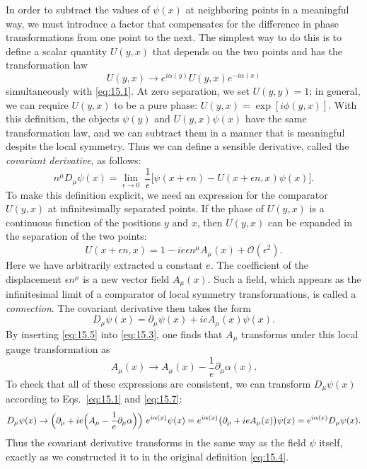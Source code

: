In order to subtract the values of $\psi(x)$ at neighboring points in a
meaningful way, we must introduce a factor that compensates for the
difference in phase transformations from one point to the next.  The simplest
way to do this is to define a scalar quantity $U(y,x)$ that depends on the
two points and has the transformation law
\begin{equation}
  U(y,x) \to e^{i\alpha(y)}U(y,x)e^{-i\alpha(x)}
  \label{eq:15.3}
\end{equation}
simultaneously with \eqref{eq:15.1}.  At zero separation, we set
$U(y,y) = 1$; in general, we can require $U(y,x)$ to be a pure phase:
$U(y,x) = \exp[i\phi(y,x)]$.  With this definition, the objects $\psi(y)$ and
$U(y,x)\psi(x)$ have the same transformation law, and we can subtract them in
a manner that is meaningful despite the local symmetry.  Thus we can define a
sensible derivative, called the \emph{covariant derivative}, as follows:
\begin{equation}
  n^\mu D_\mu\psi(x) = \lim_{\epsilon\to 0}\ \frac{1}{\epsilon}\bigl[
    \psi(x+\epsilon n) - U(x+\epsilon n, x)\psi(x) \bigr] .
  \label{eq:15.4}
\end{equation}
To make this definition explicit, we need an expression for the comparator
$U(y,x)$ at infinitesimally separated points.  If the phase of $U(y,x)$ is a
continuous function of the positions $y$ and $x$, then $U(y,x)$ can be
expanded in the separation of the two points:
\begin{equation}
  U(x+\epsilon n, x) = 1 - ie\epsilon n^\mu A_\mu(x) + \mathcal{O}(\epsilon^2) .
  \label{eq:15.5}
\end{equation}
Here we have arbitrarily extracted a constant $e$.  The coefficient of the
displacement $\epsilon n^\mu$ is a new vector field $A_\mu(x)$.  Such a field,
which appears as the infinitesimal limit of a comparator of local symmetry
transformations, is called a \emph{connection}.  The covariant derivative then
takes the form
\begin{equation}
  D_\mu\psi(x) = \partial_\mu\psi(x) + ieA_\mu(x)\psi(x) .
  \label{eq:15.6}
\end{equation}
By inserting \eqref{eq:15.5} into \eqref{eq:15.3}, one finds that $A_\mu$
transforms under this local gauge transformation as
\begin{equation}
  A_\mu(x) \to A_\mu(x) - \frac{1}{e}\partial_\mu\alpha(x) .
  \label{eq:15.7}
\end{equation}
To check that all of these expressions are consistent, we can transform
$D_\mu\psi(x)$ according to Eqs.~\eqref{eq:15.1} and \eqref{eq:15.7}:
\begin{equation}
  D_\mu\psi(x) \to \Bigl( \partial_\mu + ie\Bigl( A_\mu - \frac{1}{e}
    \partial_\mu\alpha \Bigr) \Bigr)\ e^{i\alpha(x)}\psi(x)
  = e^{i\alpha(x)}\bigl( \partial_\mu + ieA_\mu(x) \bigr)\psi(x)
  = e^{i\alpha(x)}D_\mu\psi(x) .
  \label{eq:15.8}
\end{equation}
Thus the covariant derivative transforms in the same way as the field $\psi$
itself, exactly as we constructed it to in the original definition
\eqref{eq:15.4}.

